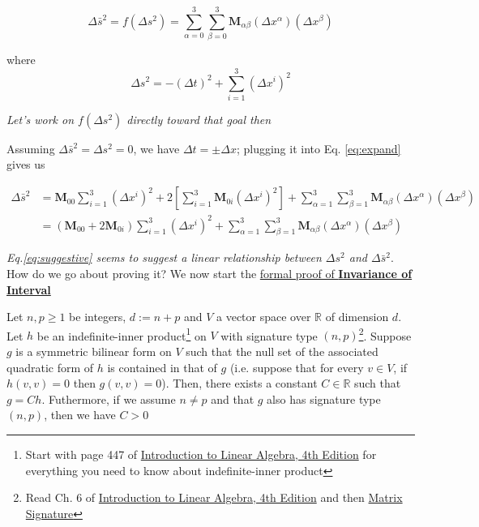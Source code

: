\begin{tcolorbox}
    \[
        \Delta \bar{s}^2 = f\left( \Delta s^2 \right) = \sum_{\alpha = 0}^3\sum_{\beta = 0}^3 \boldsymbol{M}_{\alpha\beta}\left(\Delta x^{\alpha}\right)\left(\Delta x^{\beta}\right)
    \]

    where \[ \Delta s^2 = -(\Delta t)^2 + \sum_{i = 1}^3 (\Delta x^i)^2 \]

    \begin{center}
        \textit{Let's work on $f\left( \Delta s^2 \right)$ directly toward that goal then}
    \end{center}
\end{tcolorbox}

Assuming $\Delta \bar{s}^2 = \Delta s^2 = 0$, we have $\Delta t = \pm\Delta x$; plugging it into Eq. \ref{eq:expand} gives us

\begin{align}
    \Delta\bar{s}^2 &= \boldsymbol{M}_{00}\sum_{i = 1}^3\left( \Delta x^i \right)^2 + 2\left[ \sum_{i = 1}^3\boldsymbol{M}_{0i}\left( \Delta x^i \right)^2 \right] + \sum_{\alpha = 1}^3\sum_{\beta = 1}^3 \boldsymbol{M}_{\alpha\beta}\left(\Delta x^{\alpha}\right)\left(\Delta x^{\beta}\right) \\
    &= \left( \boldsymbol{M}_{00} + 2\boldsymbol{M}_{0i} \right)\sum_{i = 1}^3\left( \Delta x^i \right)^2 + \sum_{\alpha = 1}^3\sum_{\beta = 1}^3 \boldsymbol{M}_{\alpha\beta}\left(\Delta x^{\alpha}\right)\left(\Delta x^{\beta}\right) \label{eq:suggestive}
\end{align}

\textit{Eq.\ref{eq:suggestive} seems to suggest a linear relationship between $\Delta s^2$ and $\Delta\bar{s}^2$}. How do we go about proving it? We now start the \href{https://en.wikipedia.org/wiki/Derivations\_of\_the\_Lorentz\_transformations#Rigorous\_Statement\_and\_Proof\_of\_Proportionality_of_ds2_and_ds\%E2\%80\%B22}{formal proof of \textbf{Invariance of Interval}}

\begin{mytheorem}{}{}
    Let $n, p \ge 1$ be integers, $d := n + p$ and $V$ a vector space over $\mathbb{R}$ of dimension $d$. Let $h$ be
    an indefinite-inner product\footnote{Start with page 447 of \href{https://trello.com/c/qHJeDNkU}{Introduction to Linear Algebra, 4th Edition} for everything you need to know about indefinite-inner product} on $V$ with signature type $(n, p)$\footnote{Read Ch. 6 of \href{https://trello.com/c/qHJeDNkU}{Introduction to Linear Algebra, 4th Edition} and then \href{https://mathworld.wolfram.com/MatrixSignature.html}{Matrix Signature}}. Suppose $g$ is a symmetric bilinear form on $V$
    such that the null set of the associated quadratic form of $h$ is contained in that of $g$ (i.e. suppose that for
    every $v \in V$, if $h(v, v) = 0$ then $g(v, v) = 0$). Then, there exists a constant $C \in \mathbb{R}$ such that
    $g = Ch$. Futhermore, if we assume $n \ne p$ and that $g$ also has signature type $(n, p)$, then we have $C > 0$
\end{mytheorem}

